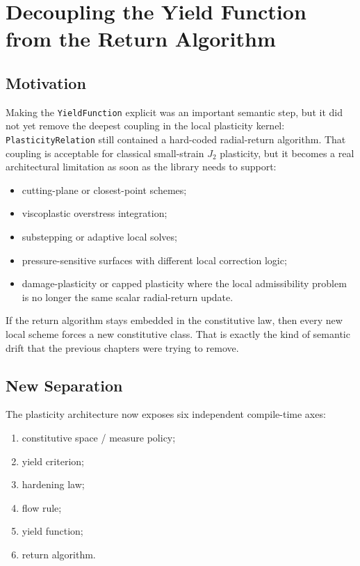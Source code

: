 \chapter{Decoupling the Yield Function from the Return Algorithm}

\section{Motivation}

Making the \texttt{YieldFunction} explicit was an important semantic step, but
it did not yet remove the deepest coupling in the local plasticity kernel:
\texttt{PlasticityRelation} still contained a hard-coded radial-return
algorithm.  That coupling is acceptable for classical small-strain \(J_2\)
plasticity, but it becomes a real architectural limitation as soon as the
library needs to support:

\begin{itemize}
  \item cutting-plane or closest-point schemes;
  \item viscoplastic overstress integration;
  \item substepping or adaptive local solves;
  \item pressure-sensitive surfaces with different local correction logic;
  \item damage-plasticity or capped plasticity where the local admissibility
        problem is no longer the same scalar radial-return update.
\end{itemize}

If the return algorithm stays embedded in the constitutive law, then every new
local scheme forces a new constitutive class.  That is exactly the kind of
semantic drift that the previous chapters were trying to remove.

\section{New Separation}

The plasticity architecture now exposes six independent compile-time axes:

\begin{enumerate}
  \item constitutive space / measure policy;
  \item yield criterion;
  \item hardening law;
  \item flow rule;
  \item yield function;
  \item return algorithm.
\end{enumerate}

